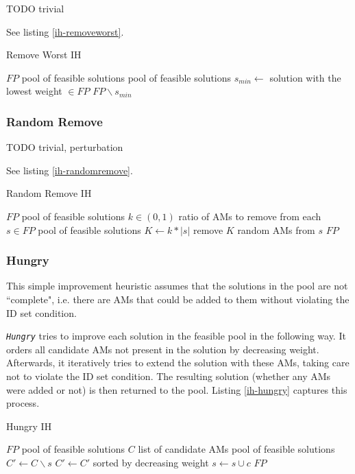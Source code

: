 \documentclass[a4paper,12pt,oneside]{report}
\newcommand{\heu}[1]{\texttt{\textit{#1}}}
\begin{document}
TODO trivial

See listing \ref{ih-removeworst}.

\begin{algorithm}
\caption{Remove Worst IH}
\label{ih-removeworst}
\begin{algorithmic}
\REQUIRE $FP$ pool of feasible solutions
\ENSURE pool of feasible solutions
\STATE $s_{min} \gets $ solution with the lowest weight $\in FP$
\RETURN $FP \backslash s_{min}$
\end{algorithmic}
\end{algorithm}

\subsubsection{Random Remove}

TODO trivial, perturbation

See listing \ref{ih-randomremove}.

\begin{algorithm}
\caption{Random Remove IH}
\label{ih-randomremove}
\begin{algorithmic}
\REQUIRE $FP$ pool of feasible solutions
\REQUIRE $k \in (0,1)$ ratio of AMs to remove from each $s \in FP$
\ENSURE pool of feasible solutions
  \STATE $K \gets k * |s|$
  \STATE remove $K$ random AMs from $s$
\ENDFOR
\RETURN $FP$
\end{algorithmic}
\end{algorithm}

\subsubsection{Hungry}

This simple improvement heuristic assumes that the solutions in the pool are not ``complete", i.e. there are AMs that could be added to them without violating the ID set condition.

\heu{Hungry} tries to improve each solution in the feasible pool in the following way. It orders all candidate AMs not present in the solution by decreasing weight. Afterwards, it iteratively tries to extend the solution with these AMs, taking care not to violate the ID set condition. The resulting solution (whether any AMs were added or not) is then returned to the pool. Listing \ref{ih-hungry} captures this process.

\begin{algorithm}
\caption{Hungry IH}
\label{ih-hungry}
\begin{algorithmic}
\REQUIRE $FP$ pool of feasible solutions
\REQUIRE $C$ list of candidate AMs
\ENSURE pool of feasible solutions
  \STATE {}
  \STATE $C' \gets C \backslash s$
  \STATE $C' \gets C'$ sorted by decreasing weight
      \STATE $s \gets s \cup c$
    \ENDIF
  \ENDFOR
\ENDFOR
\RETURN $FP$
\end{algorithmic}
\end{algorithm}
\end{document}
